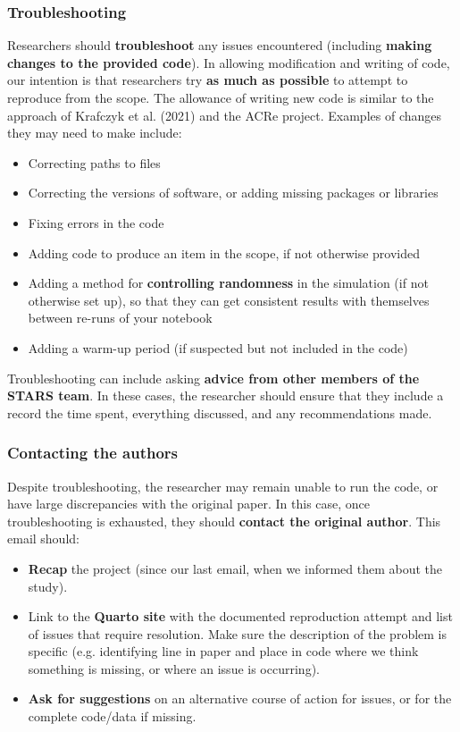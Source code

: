 \vspace{0.5cm}
\subsubsection{Troubleshooting} \label{sec:troubleshoot}

Researchers should \textbf{troubleshoot} any issues encountered (including \textbf{making changes to the provided code}). In allowing modification and writing of code, our intention is that researchers try \textbf{as much as possible} to attempt to reproduce from the scope. The allowance of writing new code is similar to the approach of Krafczyk et al. (2021)\autocite{krafczyk_learning_2021} and the ACRe project\autocite{berkeley_initiative_for_transparency_in_the_social_sciences_guide_2022}. Examples of changes they may need to make include:
\begin{itemize}
    \item Correcting paths to files
    \item Correcting the versions of software, or adding missing packages or libraries
    \item Fixing errors in the code
    \item Adding code to produce an item in the scope, if not otherwise provided
    \item Adding a method for \textbf{controlling randomness} in the simulation (if not otherwise set up), so that they can get consistent results with themselves between re-runs of your notebook
    \item Adding a warm-up period (if suspected but not included in the code)
\end{itemize}

Troubleshooting can include asking \textbf{advice from other members of the STARS team}. In these cases, the researcher should ensure that they include a record the time spent, everything discussed, and any recommendations made.

\vspace{0.5cm}
\subsubsection{Contacting the authors}

Despite troubleshooting, the researcher may remain unable to run the code, or have large discrepancies with the original paper. In this case, once troubleshooting is exhausted, they should \textbf{contact the original author}. This email should:
\begin{itemize}
    \item \textbf{Recap} the project (since our last email, when we informed them about the study).
    \item Link to the \textbf{Quarto site} with the documented reproduction attempt and list of issues that require resolution. Make sure the description of the problem is specific (e.g. identifying line in paper and place in code where we think something is missing, or where an issue is occurring).
    \item \textbf{Ask for suggestions} on an alternative course of action for issues, or for the complete code/data if missing.
\end{itemize}

